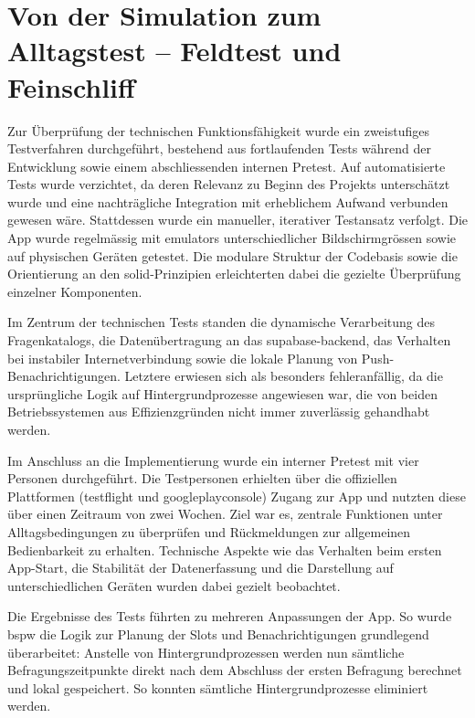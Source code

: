 \section{Von der Simulation zum Alltagstest -- Feldtest und Feinschliff}
\label{sec:app_entwicklung_feldtest}

Zur Überprüfung der technischen Funktionsfähigkeit wurde ein zweistufiges Testverfahren durchgeführt, bestehend aus fortlaufenden Tests während der Entwicklung sowie einem abschliessenden internen Pretest. Auf automatisierte Tests wurde verzichtet, da deren Relevanz zu Beginn des Projekts unterschätzt wurde und eine nachträgliche Integration mit erheblichem Aufwand verbunden gewesen wäre. Stattdessen wurde ein manueller, iterativer Testansatz verfolgt. Die App wurde regelmässig mit \glspl{emulator} unterschiedlicher Bildschirmgrössen sowie auf physischen Geräten getestet. Die modulare Struktur der Codebasis sowie die Orientierung an den \gls{solid}-Prinzipien erleichterten dabei die gezielte Überprüfung einzelner Komponenten.

Im Zentrum der technischen Tests standen die dynamische Verarbeitung des Fragenkatalogs, die Datenübertragung an das \gls{supabase}-\gls{backend}, das Verhalten bei instabiler Internetverbindung sowie die lokale Planung von Push-Benachrichtigungen. Letztere erwiesen sich als besonders fehleranfällig, da die ursprüngliche Logik auf Hintergrundprozesse angewiesen war, die von beiden Betriebssystemen aus Effizienzgründen nicht immer zuverlässig gehandhabt werden.

Im Anschluss an die Implementierung wurde ein interner Pretest mit vier Personen durchgeführt. Die Testpersonen erhielten über die offiziellen Plattformen (\gls{testflight} und \gls{googleplayconsole}) Zugang zur App und nutzten diese über einen Zeitraum von zwei Wochen. Ziel war es, zentrale Funktionen unter Alltagsbedingungen zu überprüfen und Rückmeldungen zur allgemeinen Bedienbarkeit zu erhalten. Technische Aspekte wie das Verhalten beim ersten App-Start, die Stabilität der Datenerfassung und die Darstellung auf unterschiedlichen Geräten wurden dabei gezielt beobachtet.

Die Ergebnisse des Tests führten zu mehreren Anpassungen der App. So wurde \gls{bspw} die Logik zur Planung der Slots und Benachrichtigungen grundlegend überarbeitet: Anstelle von Hintergrundprozessen werden nun sämtliche Befragungszeitpunkte direkt nach dem Abschluss der ersten Befragung berechnet und lokal gespeichert. So konnten sämtliche Hintergrundprozesse eliminiert werden.

